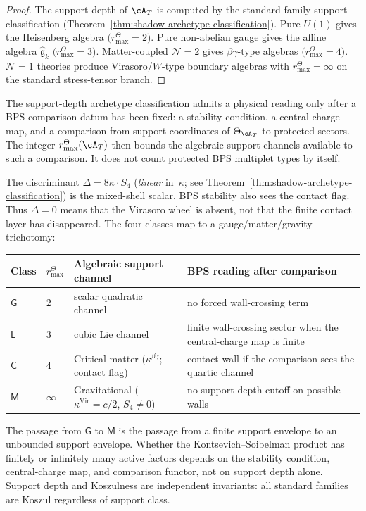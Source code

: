 \begin{proof}
The support depth of $\cA_T$ is computed by the standard-family
support classification
(Theorem~\ref{thm:shadow-archetype-classification}).
Pure $U(1)$ gives the Heisenberg algebra
\(\bigl(r^\Theta_{\max}=2\bigr)\).
Pure non-abelian gauge gives the affine algebra
$\widehat{\mathfrak{g}}_k$ \(\bigl(r^\Theta_{\max}=3\bigr)\).
Matter-coupled $\mathcal{N}=2$ gives $\beta\gamma$-type
algebras \(\bigl(r^\Theta_{\max}=4\bigr)\). $\mathcal{N}=1$ theories
produce Virasoro/$W$-type boundary algebras with
\(r^\Theta_{\max}=\infty\) on the standard stress-tensor branch.
\end{proof}


\begin{remark}
\label{rem:ht-shadow-bps-protected}
The support-depth archetype classification admits a physical reading
only after a BPS comparison datum has been fixed: a stability
condition, a central-charge map, and a comparison from support
coordinates of \(\Theta_{\cA_T}\) to protected sectors.  The integer
\(r^\Theta_{\max}(\cA_T)\) then bounds the algebraic support channels
available to such a comparison. It does not count protected BPS
multiplet types by itself.

The discriminant $\Delta = 8\kappa \cdot S_4$
(\emph{linear} in~$\kappa$; see
Theorem~\ref{thm:shadow-archetype-classification})
is the mixed-shell scalar.  BPS stability also sees the contact
flag.  Thus $\Delta=0$ means that the Virasoro wheel is absent,
not that the finite contact layer has disappeared.  The four
classes map to a gauge/matter/gravity trichotomy:
\begin{center}
\renewcommand{\arraystretch}{1.2}
\begin{tabular}{@{}llll@{}}
\toprule
\textbf{Class} & \(r^\Theta_{\max}\) & \textbf{Algebraic support channel} & \textbf{BPS reading after comparison} \\
\midrule
$\mathsf{G}$ & $2$ & scalar quadratic channel
 & no forced wall-crossing term \\
$\mathsf{L}$ & $3$ & cubic Lie channel
 & finite wall-crossing sector when the central-charge map is finite \\
$\mathsf{C}$ & $4$ & Critical matter ($\kappa^{\beta\gamma}$;
 contact flag) & contact wall if the comparison sees the quartic channel \\
$\mathsf{M}$ & $\infty$ & Gravitational ($\kappa^{\mathrm{Vir}} = c/2$,
 $S_4 \neq 0$) & no support-depth cutoff on possible walls \\
\bottomrule
\end{tabular}
\end{center}
The passage from $\mathsf{G}$ to $\mathsf{M}$ is the passage from a
finite support envelope to an unbounded support envelope.  Whether the
Kontsevich--Soibelman product has finitely or infinitely many active
factors depends on the stability condition, central-charge map, and
comparison functor, not on support depth alone. Support depth and
Koszulness are independent invariants: all standard families are
Koszul regardless of support class.
\end{remark}

